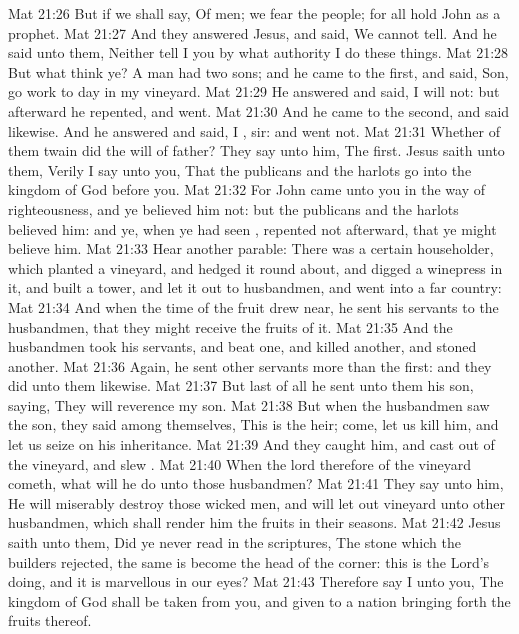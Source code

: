 \vs Mat 21:26 But if we shall say, Of men; we fear the people; for all hold John as a prophet.
\vs Mat 21:27 And they answered Jesus, and said, We cannot tell. And he said unto them, Neither tell I you by what authority I do these things.
\vs Mat 21:28 But what think ye? A  man had two sons; and he came to the first, and said, Son, go work to day in my vineyard.
\vs Mat 21:29 He answered and said, I will not: but afterward he repented, and went.
\vs Mat 21:30 And he came to the second, and said likewise. And he answered and said, I , sir: and went not.
\vs Mat 21:31 Whether of them twain did the will of  father? They say unto him, The first. Jesus saith unto them, Verily I say unto you, That the publicans and the harlots go into the kingdom of God before you.
\vs Mat 21:32 For John came unto you in the way of righteousness, and ye believed him not: but the publicans and the harlots believed him: and ye, when ye had seen , repented not afterward, that ye might believe him.
\vs Mat 21:33 Hear another parable: There was a certain householder, which planted a vineyard, and hedged it round about, and digged a winepress in it, and built a tower, and let it out to husbandmen, and went into a far country:
\vs Mat 21:34 And when the time of the fruit drew near, he sent his servants to the husbandmen, that they might receive the fruits of it.
\vs Mat 21:35 And the husbandmen took his servants, and beat one, and killed another, and stoned another.
\vs Mat 21:36 Again, he sent other servants more than the first: and they did unto them likewise.
\vs Mat 21:37 But last of all he sent unto them his son, saying, They will reverence my son.
\vs Mat 21:38 But when the husbandmen saw the son, they said among themselves, This is the heir; come, let us kill him, and let us seize on his inheritance.
\vs Mat 21:39 And they caught him, and cast  out of the vineyard, and slew .
\vs Mat 21:40 When the lord therefore of the vineyard cometh, what will he do unto those husbandmen?
\vs Mat 21:41 They say unto him, He will miserably destroy those wicked men, and will let out  vineyard unto other husbandmen, which shall render him the fruits in their seasons.
\vs Mat 21:42 Jesus saith unto them, Did ye never read in the scriptures, The stone which the builders rejected, the same is become the head of the corner: this is the Lord's doing, and it is marvellous in our eyes?
\vs Mat 21:43 Therefore say I unto you, The kingdom of God shall be taken from you, and given to a nation bringing forth the fruits thereof.
